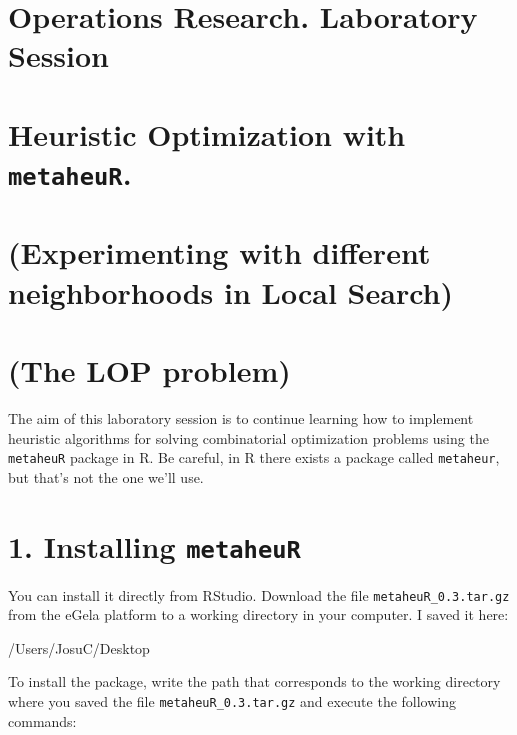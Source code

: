 \documentclass[
]{article}
\author{}
\date{\vspace{-2.5em}}
\begin{document}
\hypertarget{operations-research.-laboratory-session}{%
\section{Operations Research. Laboratory
Session}\label{operations-research.-laboratory-session}}

\hypertarget{heuristic-optimization-with-metaheur.}{%
\section{\texorpdfstring{Heuristic Optimization with
\texttt{metaheuR}.}{Heuristic Optimization with metaheuR.}}\label{heuristic-optimization-with-metaheur.}}

\hypertarget{experimenting-with-different-neighborhoods-in-local-search}{%
\section{(Experimenting with different neighborhoods in Local
Search)}\label{experimenting-with-different-neighborhoods-in-local-search}}

\hypertarget{the-lop-problem}{%
\section{(The LOP problem)}\label{the-lop-problem}}

The aim of this laboratory session is to continue learning how to
implement heuristic algorithms for solving combinatorial optimization
problems using the \texttt{metaheuR} package in R. Be careful, in R
there exists a package called \texttt{metaheur}, but that's not the one
we'll use.

\hypertarget{installing-metaheur}{%
\section{\texorpdfstring{1. Installing
\texttt{metaheuR}}{1. Installing metaheuR}}\label{installing-metaheur}}

You can install it directly from RStudio. Download the file
\texttt{metaheuR\_0.3.tar.gz} from the eGela platform to a working
directory in your computer. I saved it here:

/Users/JosuC/Desktop

To install the package, write the path that corresponds to the working
directory where you saved the file \texttt{metaheuR\_0.3.tar.gz} and
execute the following commands:
\end{document}
